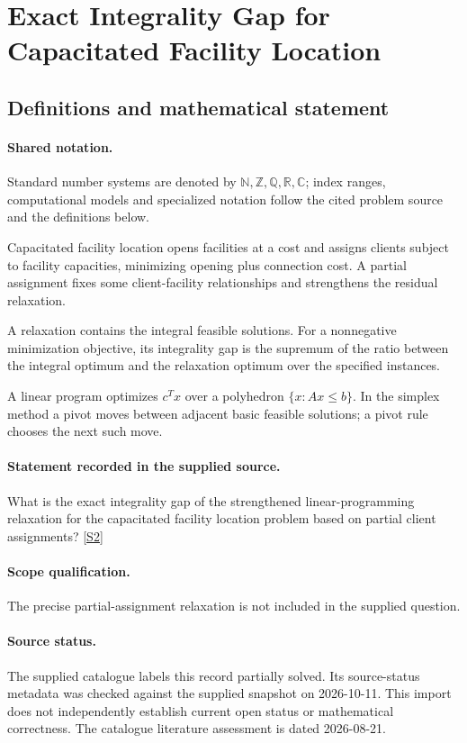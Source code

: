 \documentclass[11pt]{article}
\newcommand{\sref}[2]{\hyperlink{source:#1:#2}{[S#2]}}
\begin{document}
\section{Exact Integrality Gap for Capacitated Facility Location}\label{statement}

\subsection{Definitions and mathematical statement}

\paragraph{Shared notation.}Standard number systems are denoted by $\mathbb N,\mathbb Z,\mathbb Q,\mathbb R,\mathbb C$; index ranges, computational models and specialized notation follow the cited problem source and the definitions below.


Capacitated facility location opens facilities at a cost and assigns clients subject to facility capacities, minimizing opening plus connection cost. A partial assignment fixes some client-facility relationships and strengthens the residual relaxation.

A relaxation contains the integral feasible solutions. For a nonnegative minimization objective, its integrality gap is the supremum of the ratio between the integral optimum and the relaxation optimum over the specified instances.

A linear program optimizes $c^Tx$ over a polyhedron $\{x:Ax\leq b\}$. In the simplex method a pivot moves between adjacent basic feasible solutions; a pivot rule chooses the next such move.
\paragraph{Statement recorded in the supplied source.}
What is the exact integrality gap of the strengthened linear-programming relaxation for the capacitated facility location problem based on partial client assignments? \sref{statement}{2}
\paragraph{Scope qualification.}
The precise partial-assignment relaxation is not included in the supplied question.
\paragraph{Source status.}
The supplied catalogue labels this record partially solved. Its source-status metadata was checked against the supplied snapshot on 2026-10-11. This import does not independently establish current open status or mathematical correctness. The catalogue literature assessment is dated 2026-08-21.
\end{document}
